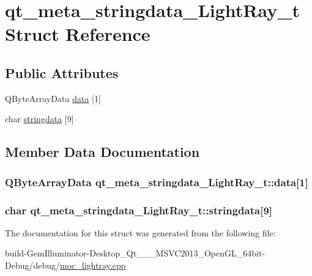 \hypertarget{structqt__meta__stringdata___light_ray__t}{\section{qt\+\_\+meta\+\_\+stringdata\+\_\+\+Light\+Ray\+\_\+t Struct Reference}
\label{structqt__meta__stringdata___light_ray__t}
}
\subsection*{Public Attributes}
\begin{DoxyCompactItemize}
\item 
Q\+Byte\+Array\+Data \hyperlink{structqt__meta__stringdata___light_ray__t_a22acc089c29dc5f6af99022ef1eae03b}{data} \mbox{[}1\mbox{]}
\item 
char \hyperlink{structqt__meta__stringdata___light_ray__t_a5a609fc2834cbfd42f192ae64ce26815}{stringdata} \mbox{[}9\mbox{]}
\end{DoxyCompactItemize}


\subsection{Member Data Documentation}
\hypertarget{structqt__meta__stringdata___light_ray__t_a22acc089c29dc5f6af99022ef1eae03b}{
\subsubsection[{data}]{\setlength{\rightskip}{0pt plus 5cm}Q\+Byte\+Array\+Data qt\+\_\+meta\+\_\+stringdata\+\_\+\+Light\+Ray\+\_\+t\+::data\mbox{[}1\mbox{]}}}\label{structqt__meta__stringdata___light_ray__t_a22acc089c29dc5f6af99022ef1eae03b}
\hypertarget{structqt__meta__stringdata___light_ray__t_a5a609fc2834cbfd42f192ae64ce26815}{
\subsubsection[{stringdata}]{\setlength{\rightskip}{0pt plus 5cm}char qt\+\_\+meta\+\_\+stringdata\+\_\+\+Light\+Ray\+\_\+t\+::stringdata\mbox{[}9\mbox{]}}}\label{structqt__meta__stringdata___light_ray__t_a5a609fc2834cbfd42f192ae64ce26815}


The documentation for this struct was generated from the following file\+:\begin{DoxyCompactItemize}
\item 
build-\/\+Gem\+Illuminator-\/\+Desktop\+\_\+\+Qt\+\_\+\_\+\_\+\+M\+S\+V\+C2013\+\_\+\+Open\+G\+L\+\_\+64bit-\/\+Debug/debug/\hyperlink{moc__lightray_8cpp}{moc\+\_\+lightray.\+cpp}\end{DoxyCompactItemize}
